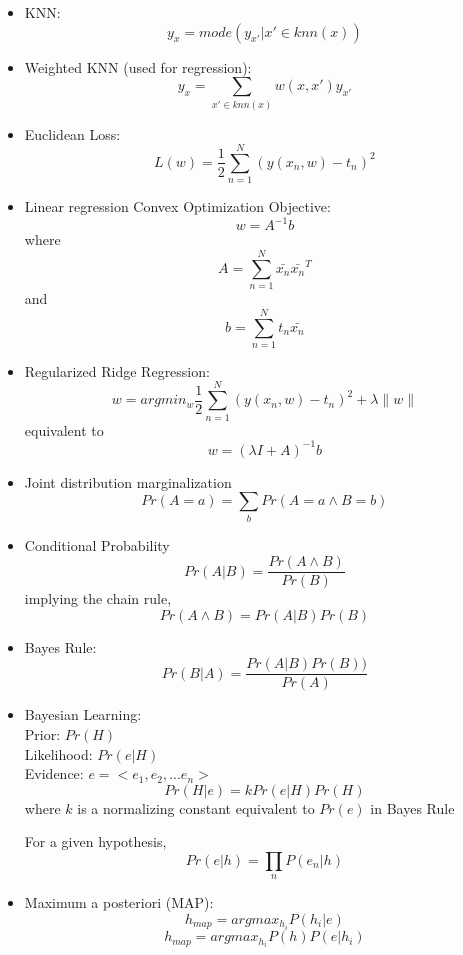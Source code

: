 \documentclass[parskip=half]{scrartcl}
\begin{document}
    \begin{itemize}

        \item 
        KNN: 
        $$y_x = mode({y_{x'}| x' \in knn(x)})$$

        \item 
        Weighted KNN (used for regression): 
        $$y_x = \sum_{x' \in knn(x)} w(x, x') y_{x'}$$

        \item 
        Euclidean Loss: 
        $$L(w) = \frac{1}{2} \sum_{n=1}^{N} (y(x_n, w) - t_n)^2 $$

        \item 
        Linear regression Convex Optimization Objective:
        $$w = A^{-1}b$$
        where
        $$A = \sum_{n=1}^{N} \bar{x_n} \bar{x_n}^T$$ and $$b = \sum_{n=1}^{N} t_n \bar{x_n}$$

        \item 
        Regularized Ridge Regression: 
        $$w = argmin_w \frac{1}{2} \sum_{n=1}^{N} (y(x_n, w) - t_n)^2 + \lambda \lVert w \rVert $$
        equivalent to 
        $$w = (\lambda I + A)^{-1}b$$

        \item 
        Joint distribution marginalization
        $$Pr(A = a) = \sum_b Pr(A = a \wedge B = b) $$

        \item 
        Conditional Probability
        $$Pr(A|B) = \frac{Pr(A \wedge B)}{Pr(B)} $$
        implying the chain rule,
        $$Pr(A \wedge B) = Pr(A|B) Pr(B)$$

        \item 
        Bayes Rule:
        $$Pr(B|A) = \frac{Pr(A|B) Pr(B))}{Pr(A)} $$

        \item 
        Bayesian Learning: \\
        Prior: $Pr(H)$ \\
        Likelihood: $Pr(e|H)$ \\
        Evidence: $e = <e_1, e_2, ... e_n>$
        $$Pr(H|e) = k Pr(e|H) Pr(H)$$
        where $k$ is a normalizing constant equivalent to $Pr(e)$ in Bayes Rule

        For a given hypothesis,
        $$Pr(e|h) = \prod_n P(e_n|h)$$

        \item 
        Maximum a posteriori (MAP):
        $$h_{map} = argmax_{h_i} P(h_i|e)$$
        $$h_{map} = argmax_{h_i} P(h) P(e|h_i)$$


\end{itemize}
\end{document}
